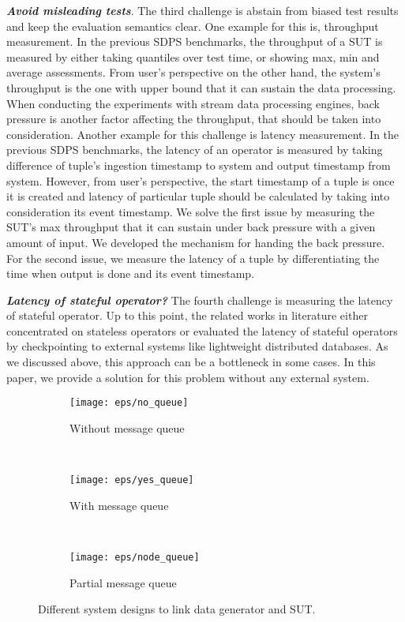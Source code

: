 \textbf{ \textit{ Avoid misleading tests}}.
The third challenge is abstain from biased test results and keep the evaluation semantics clear.  One example for this is, throughput measurement. In the previous SDPS benchmarks, the throughput of a SUT is measured by either taking quantiles over test time, or showing max, min and average assessments. From user's perspective on the other hand, the system's throughput is the one with upper bound that it can sustain the data processing. When conducting the experiments with stream data processing engines, back pressure is another factor affecting the throughput, that should be taken into consideration.  Another example for this challenge is latency measurement. In the previous SDPS benchmarks, the latency of an operator is measured by taking difference of tuple's ingestion timestamp to system and output timestamp from system. However, from user's perspective, the start timestamp of a tuple is once it is created and latency of particular tuple should be calculated by taking into consideration its event timestamp. We solve the first issue by measuring the SUT's max throughput that it can sustain under back pressure with a given amount of input. We developed the mechanism for handing the back pressure.  For the second issue, we measure the latency of a tuple by differentiating the time when output is done and its event timestamp.


\textbf{ \textit{ Latency of stateful operator?}} The fourth challenge is measuring the latency of stateful operator. Up to this point, the related works in literature either concentrated on stateless operators or evaluated the latency of stateful operators by checkpointing to external systems like lightweight distributed databases. As we discussed above, this approach can be a bottleneck in some cases. In this paper, we provide a solution for this problem without any external system. 


\begin{figure*}
    \centering
    \begin{subfigure}[b]{0.32\textwidth}
        \texttt{[image: eps/no\_queue]}
        \caption{Without message queue}
        \label{fig_no_queue}
    \end{subfigure}
    ~ %
    \begin{subfigure}[b]{0.32\textwidth}
        \texttt{[image: eps/yes\_queue]}
        \caption{With message queue}
        \label{fig_yes_queue}
    \end{subfigure}
    ~ %
    \begin{subfigure}[b]{0.32\textwidth}
        \texttt{[image: eps/node\_queue]}
        \caption{Partial message queue}
        \label{fig_partial_queue}
    \end{subfigure}
    \label{fig_queue_link}
        \caption{Different system designs to link data generator and SUT.}
\end{figure*}
